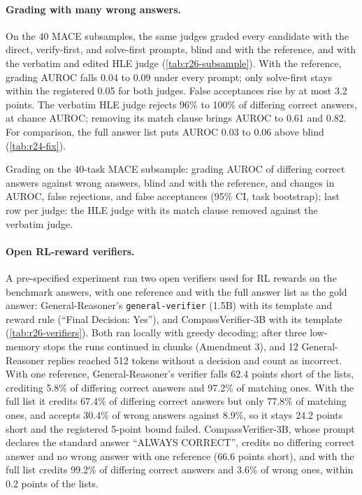 \paragraph{Grading with many wrong answers.} On the 40 \textsc{MACE} subsamples, the same judges graded every candidate with the direct, verify-first, and solve-first prompts, blind and with the reference, and with the verbatim and edited HLE judge (\cref{tab:r26-subsample}). With the reference, grading AUROC falls 0.04 to 0.09 under every prompt; only solve-first stays within the registered 0.05 for both judges. False acceptances rise by at most 3.2 points. The verbatim HLE judge rejects 96\% to 100\% of differing correct answers, at chance AUROC; removing its match clause brings AUROC to 0.61 and 0.82. For comparison, the full answer list puts AUROC 0.03 to 0.06 above blind (\cref{tab:r24-fix}).

\begin{table}[htbp]
\centering
\caption{Grading on the 40-task \textsc{MACE} subsample: grading AUROC of differing correct answers against wrong answers, blind and with the reference, and changes in AUROC, false rejections, and false acceptances (95\% CI, task bootstrap); last row per judge: the HLE judge with its match clause removed against the verbatim judge.\pre}
\label{tab:r26-subsample}
\footnotesize
\setlength{\tabcolsep}{3pt}
\begin{adjustbox}{max width=\linewidth}\end{adjustbox}
\end{table}

\paragraph{Open RL-reward verifiers.} A pre-specified experiment ran two open verifiers used for RL rewards on the benchmark answers, with one reference and with the full answer list as the gold answer: General-Reasoner's \texttt{general-verifier} (1.5B) with its template and reward rule (``Final Decision: Yes''), and CompassVerifier-3B with its template (\cref{tab:r26-verifiers}). Both ran locally with greedy decoding; after three low-memory stops the runs continued in chunks (Amendment 3), and 12 General-Reasoner replies reached 512 tokens without a decision and count as incorrect. With one reference, General-Reasoner's verifier falls 62.4 points short of the lists, crediting 5.8\% of differing correct answers and 97.2\% of matching ones. With the full list it credits 67.4\% of differing correct answers but only 77.8\% of matching ones, and accepts 30.4\% of wrong answers against 8.9\%, so it stays 24.2 points short and the registered 5-point bound failed. CompassVerifier-3B, whose prompt declares the standard answer ``ALWAYS CORRECT'', credits no differing correct answer and no wrong answer with one reference (66.6 points short), and with the full list credits 99.2\% of differing correct answers and 3.6\% of wrong ones, within 0.2 points of the lists.

